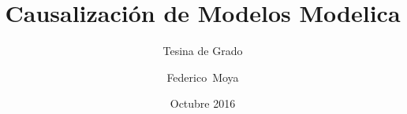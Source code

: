 \documentclass{beamer}
\title[] %
{Causalización de Modelos Modelica}
\subtitle{Tesina de Grado}
\author[] %
{Federico~Moya}
\institute[] %
{
  Licenciatura en Cs. de la Computación\\
  Facultad de Cs. Exactas, Ingeniería y Agrimensura\\
  Universidad Nacional de Rosario
}
\date[] %
{Octubre 2016}
\begin{document}
\begin{frame}
    \titlepage
\end{frame}






 





\end{document}

